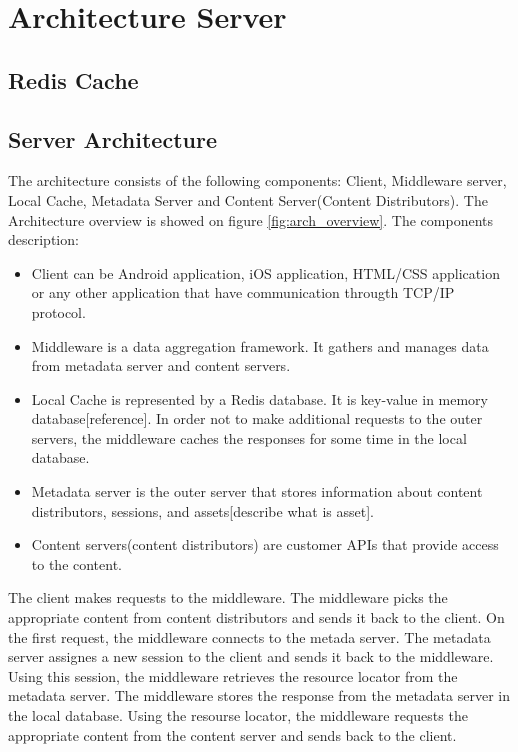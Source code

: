 \section{Architecture Server}

\subsection{Redis Cache}

\subsection{Server Architecture}

The architecture consists of the following components: Client, Middleware server, Local Cache, Metadata Server and Content Server(Content Distributors). The Architecture overview is showed on figure \ref{fig:arch_overview}. The components description:

\begin{itemize}
	\item Client can be Android application, iOS application, HTML/CSS application or any other application that have communication througth TCP/IP protocol.
    \item Middleware is a data aggregation framework. It gathers and manages data from metadata server and content servers.
    \item Local Cache is represented by a Redis database. It is key-value in memory database[reference]. In order not to make additional requests to the outer servers, the middleware caches the responses for some time in the local database.
    \item Metadata server is the outer server that stores information about content distributors, sessions, and assets[describe what is asset].
    \item Content servers(content distributors) are customer APIs that provide access to the content.

\end{itemize}

The client makes requests to the middleware. The middleware picks the appropriate content from content distributors and sends it back to the client. On the first request, the middleware connects to the metada server. The metadata server assignes a new session to the client and sends it back to the middleware. Using this session, the middleware retrieves the resource locator from the metadata server. The middleware stores the response from the metadata server in the local database. Using the resourse locator, the middleware requests the appropriate content from the content server and sends back to the client.

